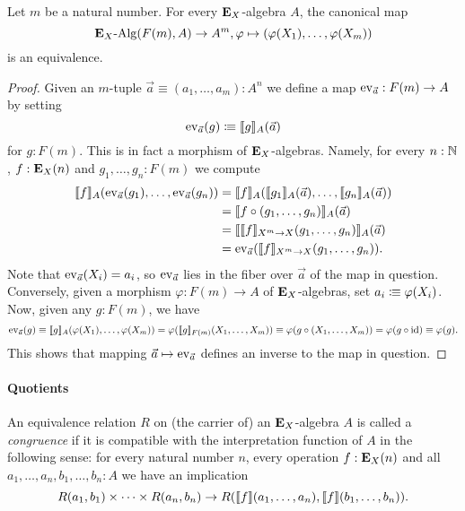 {\begin{lemma}
  Let \(m\) be a natural number.
  For every \(\mathbf{E}_X\)-algebra \(A\), the canonical map
  \[
    \mathbf{E}_X\text{-}\mathrm{Alg}(F(m),A) \to A^m, \varphi \mapsto (\varphi(X_1),\dots,\varphi(X_m))
  \]
  is an equivalence.
\end{lemma}
\begin{proof}
  Given an \(m\)-tuple \(\vec a\equiv (a_1,\dots,a_m) : A^n\) we define a map \(\operatorname{\mathrm{ev}}_{\vec a} : F(m)\to A\) by setting
  \[\operatorname{\mathrm{ev}}_{\vec a}(g) \vcentcolon\mspace{-1.2mu}\equiv \llbracket g\rrbracket_A(\vec a)\]
  for \(g:F(m)\).
  This is in fact a morphism of \(\mathbf{E}_X\)-algebras.
  Namely, for every \(n:\mathbb{N}\), \(f:\mathbf{E}_X(n)\) and \(g_1,\dots,g_n : F(m)\) we compute
  \begin{align*}
    \llbracket f\rrbracket_A(\operatorname{\mathrm{ev}}_{\vec a}(g_1),\dots,\operatorname{\mathrm{ev}}_{\vec a}(g_n)) & = \llbracket f\rrbracket_A(\llbracket g_1\rrbracket_A(\vec a),\dots,\llbracket g_n\rrbracket_A(\vec a)) \\
    & = \llbracket f\circ(g_1,\dots,g_n)\rrbracket_A (\vec a)\\
    & = \llbracket\llbracket f\rrbracket_{X^m\to X}(g_1,\dots,g_n)\rrbracket_A (\vec a)\\
    & = \operatorname{\mathrm{ev}}_{\vec a}(\llbracket f\rrbracket_{X^m \to X}(g_1,\dots,g_n)).
  \end{align*}
  Note that \(\operatorname{\mathrm{ev}}_{\vec a}(X_i) = a_i\), so \(\operatorname{\mathrm{ev}}_{\vec a}\) lies in the fiber over \(\vec a\) of the map in question.
  Conversely, given a morphism \(\varphi : F(m)\to A\) of \(\mathbf{E}_X\)-algebras, set \(a_i\vcentcolon\mspace{-1.2mu}\equiv \varphi(X_i)\).
  Now, given any \(g:F(m)\), we have
  \begin{equation*}
    \operatorname{\mathrm{ev}}_{\vec a}(g)
    \equiv \llbracket g\rrbracket_A(\varphi(X_1),\dots,\varphi(X_m))
     = \varphi(\llbracket g\rrbracket_{F(m)}(X_1,\dots,X_m))
     \equiv \varphi(g\circ (X_1,\dots,X_m))
     = \varphi(g\circ\mathrm{id}) \equiv \varphi(g).
  \end{equation*}
  This shows that mapping \(\vec a \mapsto \operatorname{\mathrm{ev}}_{\vec a}\) defines an inverse to the map in question.
\end{proof}

\paragraph{Quotients}
\begin{definition}
  An equivalence relation \(R\) on (the carrier of) an \(\mathbf{E}_X\)-algebra \(A\) is called a \emph{congruence} if it is compatible with the interpretation function of \(A\) in the following sense:
  for every natural number \(n\), every operation \(f:\mathbf{E}_X(n)\) and all \(a_1,\dots,a_n,b_1,\dots,b_n : A\) we have an implication
  \[
    R(a_1,b_1) \times \dots\times R(a_n,b_n) \to R(\llbracket f\rrbracket(a_1,\dots,a_n),\llbracket f\rrbracket(b_1,\dots,b_n)).
  \]
\end{definition}

}
